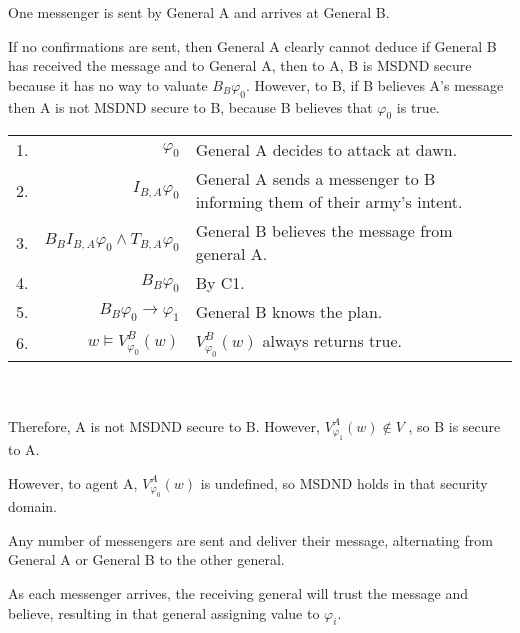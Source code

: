 \begin{case}
One messenger is sent by General A and arrives at General B.
\label{case:generalsn0}
\end{case}

If no confirmations are sent, then General A clearly cannot deduce if General B has received the message and to General A, then to A, B is MSDND secure because it has no way to valuate $B_B \varphi_0$. However, to B, if B believes A's message then A is not MSDND secure to B, because B believes that $\varphi_0$ is true.

\begin{table}[]
\centering
\begin{tabular}{r r l}
1. & $\varphi_0$ & General A decides to attack at dawn. \\
2. & $I_{B,A} \varphi_0$ & General A sends a messenger to B informing them of their army's intent. \\
3. & $B_{B}I_{B,A} \varphi_0 \wedge T_{B,A} \varphi_0$ & General B believes the message from general A. \\
4. & $B_{B} \varphi_0$ & By C1. \\
5. & $B_{B} \varphi_0 \rightarrow \varphi_1$ & General B knows the plan. \\
6. & $w \vDash V_{\varphi_0}^{B}(w)$ & $V_{\varphi_0}^{B}(w)$ always returns true. \\
\end{tabular} \\~\\
Therefore, A is not MSDND secure to B. However, $V_{\varphi_1}^{A}(w) \not \in V$ , so B is secure to A.
\label{tab:twoarmiesproof}
\end{table}

However, to agent A, $V_{\varphi_{0}}^A(w)$ is undefined, so MSDND holds in that security domain. 

\begin{case}
Any number of messengers are sent and deliver their message, alternating from General A or General B to the other general. \label{case:generalsnn}
\end{case}

As each messenger arrives, the receiving general will trust the message and believe, resulting in that general assigning value to $\varphi_i$.

